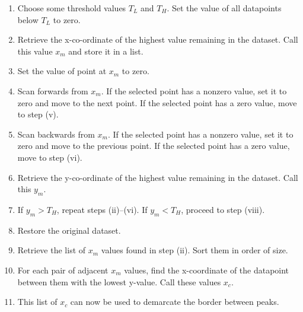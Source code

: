 \begin{enumerate}
  \item Choose some threshold values $T_L$ and $T_H$.  Set the value of all datapoints below $T_L$ to zero.
  \item Retrieve the x-co-ordinate of the highest value remaining in the dataset.  Call this value $x_m$ and store it in a list.
  \item Set the value of point at $x_m$ to zero.
  \item Scan forwards from $x_m$.  If the selected point has a nonzero value, set it to zero and move to the next point.  If the selected point has a zero value, move to step (v).
  \item Scan backwards from $x_m$.  If the selected point has a nonzero value, set it to zero and move to the previous point.  If the selected point has a zero value, move to step (vi).
  \item Retrieve the y-co-ordinate of the highest value remaining in the dataset.  Call this $y_m$.
  \item If $y_m>T_H$, repeat steps (ii)--(vi).  If $y_m<T_H$, proceed to step (viii).
  \item Restore the original dataset.
  \item Retrieve the list of $x_m$ values found in step (ii).  Sort them in order of size.
  \item For each pair of adjacent $x_m$ values, find the x-coordinate of the datapoint between them with the lowest y-value.  Call these values $x_c$.
  \item This list of $x_c$ can now be used to demarcate the border between peaks.
\end{enumerate}


